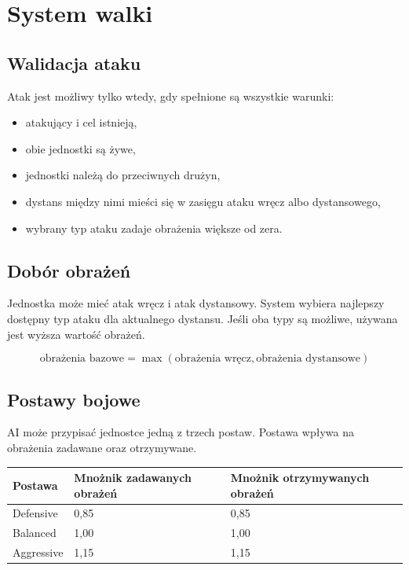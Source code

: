 \documentclass[12pt,a4paper]{article}
\begin{document}
\newpage

\section{System walki}

\subsection{Walidacja ataku}

Atak jest możliwy tylko wtedy, gdy spełnione są wszystkie warunki:

\begin{itemize}
    \item atakujący i cel istnieją,
    \item obie jednostki są żywe,
    \item jednostki należą do przeciwnych drużyn,
    \item dystans między nimi mieści się w zasięgu ataku wręcz albo dystansowego,
    \item wybrany typ ataku zadaje obrażenia większe od zera.
\end{itemize}

\subsection{Dobór obrażeń}

Jednostka może mieć atak wręcz i atak dystansowy. System wybiera najlepszy dostępny typ ataku dla aktualnego dystansu. Jeśli oba typy są możliwe, używana jest wyższa wartość obrażeń.

\begin{equation}
    \text{obrażenia bazowe} = \max(\text{obrażenia wręcz}, \text{obrażenia dystansowe})
\end{equation}

\subsection{Postawy bojowe}

AI może przypisać jednostce jedną z trzech postaw. Postawa wpływa na obrażenia zadawane oraz otrzymywane.

\begin{longtable}{p{4cm} p{5cm} p{5cm}}
\toprule
\textbf{Postawa} & \textbf{Mnożnik zadawanych obrażeń} & \textbf{Mnożnik otrzymywanych obrażeń} \\
\midrule
\endhead
Defensive & 0{,}85 & 0{,}85 \\[4pt]
Balanced & 1{,}00 & 1{,}00 \\[4pt]
Aggressive & 1{,}15 & 1{,}15 \\
\bottomrule
\end{longtable}
\end{document}
